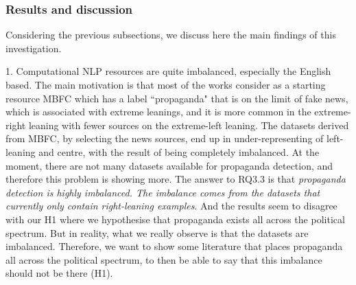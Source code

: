 \subsubsection{Results and discussion}
\label{ssec:ps_prop_leaning_imbalanced_discussion}

Considering the previous subsections, we discuss here the main findings of this investigation.




1. Computational NLP resources are quite imbalanced, especially the English based. The main motivation is that most of the works consider as a starting resource MBFC which has a label ``propaganda" that is on the limit of fake news, which is associated with extreme leanings, and it is more common in the extreme-right leaning with fewer sources on the extreme-left leaning. The datasets derived from MBFC, by selecting the news sources, end up in under-representing of left-leaning and centre, with the result of being completely imbalanced.
At the moment, there are not many datasets available for propaganda detection, and therefore this problem is showing more.
The answer to RQ3.3 is that \emph{propaganda detection is highly imbalanced. The imbalance comes from the datasets that currently only contain right-leaning examples}.
And the results seem to disagree with our H1 where we hypothesise that propaganda exists all across the political spectrum.
But in reality, what we really observe is that the datasets are imbalanced. Therefore, we want to show some literature that places propaganda all across the political spectrum, to then be able to say that this imbalance should not be there (H1).


